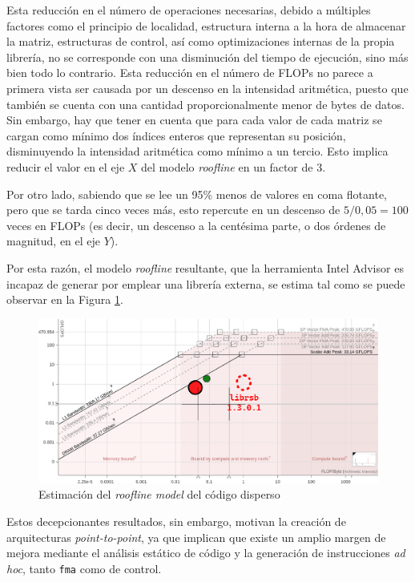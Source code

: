 Esta reducción en el número de operaciones necesarias, debido a múltiples factores como el principio de localidad, estructura interna a la hora de almacenar la matriz, estructuras de control, así como optimizaciones internas de la propia librería, no se corresponde con una disminución del tiempo de ejecución, sino más bien todo lo contrario. Esta reducción en el número de FLOPs no parece a primera vista ser causada por un descenso en la intensidad aritmética, puesto que también se cuenta con una cantidad proporcionalmente menor de bytes de datos. Sin embargo, hay que tener en cuenta que para cada valor de cada matriz se cargan como mínimo dos índices enteros que representan su posición, disminuyendo la intensidad aritmética como mínimo a un tercio. Esto implica reducir el valor en el eje $X$ del modelo \textit{roofline} en un factor de 3.

Por otro lado, sabiendo que se lee un 95\% menos de valores en coma flotante, pero que se tarda cinco veces más, esto repercute en un descenso de $5/0{,}05=100$ veces en FLOPs (es decir, un descenso a la centésima parte, o dos órdenes de magnitud, en el eje $Y$).

Por esta razón, el modelo \textit{roofline} resultante, que la herramienta Intel Advisor es incapaz de generar por emplear una librería externa, se estima tal como se puede observar en la Figura \ref{fig:roofline_sparse_estimado}.

\begin{figure}[h!]
    \centering
    \includegraphics[width=\textwidth]{img/rooflines/roofline_sparse_estimado.png}
    \caption{Estimación del \textit{roofline model} del código disperso}
    \label{fig:roofline_sparse_estimado}
\end{figure}

Estos decepcionantes resultados, sin embargo, motivan la creación de arquitecturas \textit{point-to-point}, ya que implican que existe un amplio margen de mejora mediante el análisis estático de código y la generación de instrucciones \textit{ad hoc}, tanto \texttt{\acrshort{fma}} como de control.


